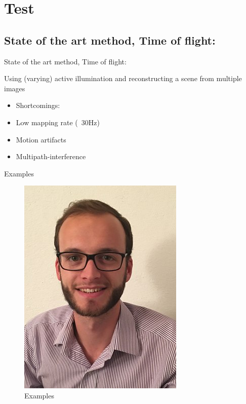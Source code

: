 %
%
\section{Test}
\subsection{State of the art method, Time of flight:}
\begin{frame}{State of the art method, Time of flight:}

Using (varying) active illumination and reconstructing a scene from multiple images

\begin{itemize}
\item Shortcomings:
\item Low mapping rate (~30Hz)
\item Motion artifacts
\item Multipath-interference
\end{itemize}

\end{frame}

\begin{frame}{Examples}
\begin{figure}
\includegraphics[scale=0.9]{pictures/polop}
\caption{Examples}
\end{figure}
\end{frame}

